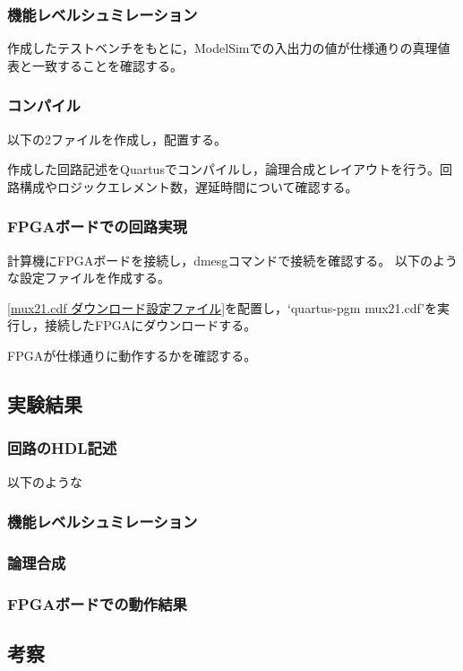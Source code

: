 \documentclass[a4paper,15pt]{jsarticle}
\begin{document}
\subsubsection{機能レベルシュミレーション}
作成したテストベンチをもとに，ModelSimでの入出力の値が仕様通りの真理値表と一致することを確認する。

\subsubsection{コンパイル}
以下の2ファイルを作成し，配置する。



作成した回路記述をQuartusでコンパイルし，論理合成とレイアウトを行う。回路構成やロジックエレメント数，遅延時間について確認する。

\subsubsection{FPGAボードでの回路実現}
計算機にFPGAボードを接続し，dmesgコマンドで接続を確認する。
以下のような設定ファイルを作成する。

\ref{mux21.cdf ダウンロード設定ファイル}を配置し，`quartus-pgm mux21.cdf'を実行し，接続したFPGAにダウンロードする。

FPGAが仕様通りに動作するかを確認する。

\subsection{実験結果}
\subsubsection{回路のHDL記述}
以下のような
\subsubsection{機能レベルシュミレーション}
\subsubsection{論理合成}
\subsubsection{FPGAボードでの動作結果}
\subsection{考察}
\end{document}
